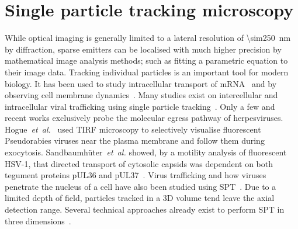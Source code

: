 \section{Single particle tracking microscopy}

While optical imaging is generally limited to a lateral resolution of \SI{\sim250}{\nano\metre} by diffraction, sparse emitters can be localised with much higher precision by mathematical image analysis methods; such as fitting a parametric equation to their image data.
Tracking individual particles is an important tool for modern biology.
It has been used to study intracellular transport of mRNA~\cite{spilleDirectObservationMobility2015} and by observing cell membrane dynamics~\cite{cognetAdvancesLivecellSingleparticle2014}.
Many studies exist on intercellular and intracellular viral trafficking
using single particle tracking~\cite{brandenburgVirusTraffickingLearning2007a}.
Only a few and recent works exclusively probe the molecular egress pathway of herpesviruses.
Hogue~\emph{et~al.}~\cite{hogueCellularMechanismsAlpha2014} used \gls{TIRF} microscopy to selectively visualise fluorescent Pseudorabies viruses near the plasma membrane and follow them during exocytosis.
Sandbaumhüter~\emph{et~al.} showed, by a motility analysis of fluorescent \gls{HSV}-1, that directed transport of cytosolic capsids was dependent on both tegument proteins pUL36 and pUL37~\cite{sandbaumhuterCytosolicHerpesSimplex2013}.
Virus trafficking and how viruses penetrate the nucleus of a cell have also been studied using \gls{SPT}~\cite{brandenburg_virus_2007}.
Due to a limited depth of field, particles tracked in a \gls{3D} volume tend leave the axial detection range.
Several technical approaches already exist to perform \gls{SPT} in three dimensions~\cite{
toprakThreeDimensionalParticleTracking2007,
juetteThreeDimensionalTrackingSingle2010,
wellsTimeResolved3D2010a,
spilleDynamicThreedimensionalTracking2012a}.

